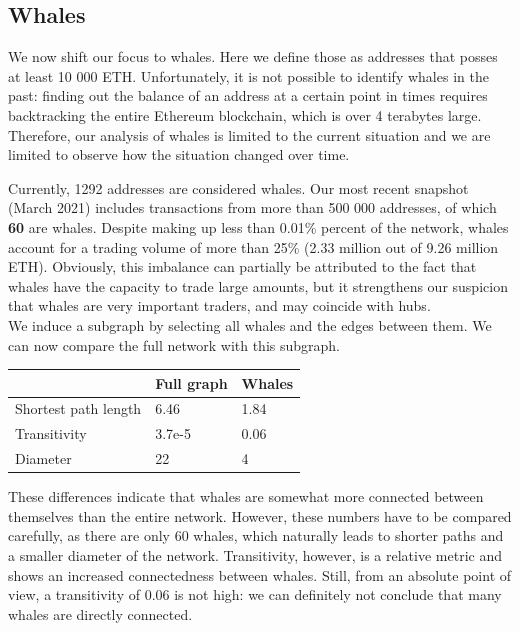 \documentclass[10pt,a4paper]{article}
\begin{document}
\begin{multicols}{2}
\subsection{Whales}
We now shift our focus to whales. Here we define those as addresses that posses at least 10 000 ETH. Unfortunately, it is not possible to identify whales in the past: finding out the balance of an address at a certain point in times requires backtracking the entire Ethereum blockchain, which is over 4 terabytes large. Therefore, our analysis of whales is limited to the current situation and we are limited to observe how the situation changed over time.

Currently, 1292 addresses are considered whales. Our most recent snapshot (March 2021) includes transactions from more than 500 000 addresses, of which \textbf{60} are whales. Despite making up less than 0.01\% percent of the network, whales account for a trading volume of more than 25\% (2.33 million out of 9.26 million ETH). Obviously, this imbalance can partially be attributed to the fact that whales have the capacity to trade large amounts, but it strengthens our suspicion that whales are very important traders, and may coincide with hubs.\\

We induce a subgraph by selecting all whales and the edges between them. We can now compare the full network with this subgraph.

\vspace{5pt}
\bgroup
\def\arraystretch{1.5}
\begin{tabular}{p{}|p{}|p{}}
 & \textbf{Full graph} & \textbf{Whales} \\ 
\hline 
Shortest path length & 6.46 & 1.84 \\
Transitivity & 3.7e-5 & 0.06\\
Diameter & 22 & 4 \\
\end{tabular}
\egroup
\vspace{5pt}

These differences indicate that whales are somewhat more connected between themselves than the entire network. However, these numbers have to be compared carefully, as there are only 60 whales, which naturally leads to shorter paths and a smaller diameter of the network. Transitivity, however, is a relative metric and shows an increased connectedness between whales. Still, from an absolute point of view, a transitivity of 0.06 is not high: we can definitely not conclude that many whales are directly connected.


\end{multicols}
\end{document}
